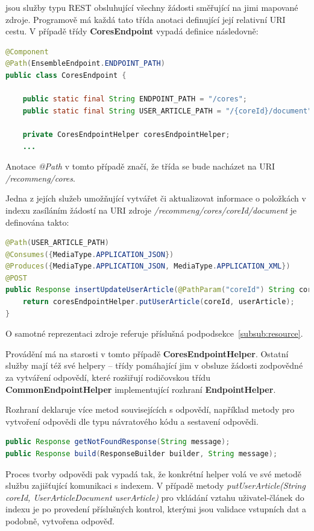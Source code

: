 \documentclass[thesis=M,czech]{FITthesis}[2014/05/07]
\begin{document}
jsou služby typu REST obsluhující všechny žádosti směřující na jimi mapované zdroje. Programově má každá tato třída anotaci definující její relativní URI cestu. V případě třídy \textbf{CoresEndpoint} vypadá definice následovně:

\begin{lstlisting}[language=java]
@Component
@Path(EnsembleEndpoint.ENDPOINT_PATH)
public class CoresEndpoint {
    
    public static final String ENDPOINT_PATH = "/cores";
    public static final String USER_ARTICLE_PATH = "/{coreId}/document";

	private CoresEndpointHelper coresEndpointHelper; 		
    ...
\end{lstlisting}

Anotace \emph{@Path} v tomto případě značí, že třída se bude nacházet na URI \emph{/recommeng/cores}.

Jedna z jejích služeb umožňující vytvářet či aktualizovat informace o položkách v indexu zasíláním žádostí na URI zdroje \emph{/recommeng/cores/{coreId}/document} je definována takto:

\begin{lstlisting}[language=java]
@Path(USER_ARTICLE_PATH)
@Consumes({MediaType.APPLICATION_JSON})
@Produces({MediaType.APPLICATION_JSON, MediaType.APPLICATION_XML})
@POST
public Response insertUpdateUserArticle(@PathParam("coreId") String coreId, UserArticleDocument userArticle) {
    return coresEndpointHelper.putUserArticle(coreId, userArticle);
}    
\end{lstlisting}

O samotné reprezentaci zdroje referuje příslušná podpodsekce~\ref{subsub:resource}.

Provádění má na starosti v tomto případě \textbf{CoresEndpointHelper}. Ostatní služby mají též své helpery – třídy pomáhající jim v obsluze žádosti zodpovědné za vytváření odpovědí, které rozšiřují rodičovskou třídu \textbf{CommonEndpointHelper} implementující rozhraní \textbf{EndpointHelper}.

Rozhraní deklaruje více metod souvisejících s odpovědí, například metody pro vytvoření odpovědi dle typu návratového kódu a sestavení odpovědi.

\begin{lstlisting}[language=java]
public Response getNotFoundResponse(String message);
public Response build(ResponseBuilder builder, String message);
\end{lstlisting}

Proces tvorby odpovědi pak vypadá tak, že konkrétní helper volá ve své metodě službu zajišťující komunikaci s indexem. V případě metody \emph{putUserArticle(String coreId, UserArticleDocument userArticle)} pro vkládání vztahu uživatel-článek do indexu je po provedení příslušných kontrol, kterými jsou validace vstupních dat a podobně, vytvořena odpověď.
\end{document}
